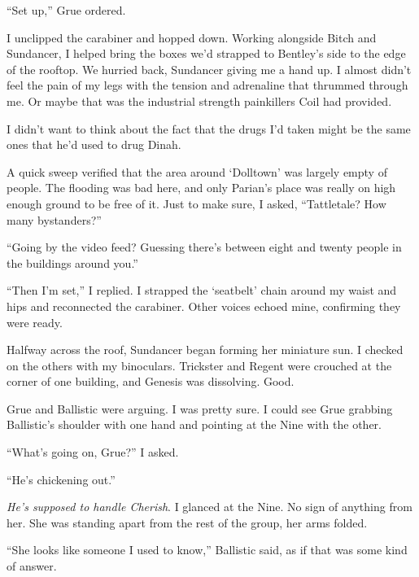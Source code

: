 ``Set up,'' Grue ordered.



I unclipped the carabiner and hopped down.  Working alongside Bitch and Sundancer, I helped bring the boxes we'd strapped to Bentley's side to the edge of the rooftop.  We hurried back, Sundancer giving me a hand up.  I almost didn't feel the pain of my legs with the tension and adrenaline that thrummed through me.  Or maybe that was the industrial strength painkillers Coil had provided.



I didn't want to think about the fact that the drugs I'd taken might be the same ones that he'd used to drug Dinah.



A quick sweep verified that the area around `Dolltown' was largely empty of people.  The flooding was bad here, and only Parian's place was really on high enough ground to be free of it.  Just to make sure, I asked, ``Tattletale?  How many bystanders?''



``Going by the video feed?  Guessing there's between eight and twenty people in the buildings around you.''



``Then I'm set,'' I replied.  I strapped the `seatbelt' chain around my waist and hips and reconnected the carabiner.  Other voices echoed mine, confirming they were ready.



Halfway across the roof, Sundancer began forming her miniature sun.  I checked on the others with my binoculars.  Trickster and Regent were crouched at the corner of one building, and Genesis was dissolving.  Good.



Grue and Ballistic were arguing.  I was pretty sure.  I could see Grue grabbing Ballistic's shoulder with one hand and pointing at the Nine with the other.



``What's going on, Grue?'' I asked.



``He's chickening out.''



\emph{He's supposed to handle Cherish}.  I glanced at the Nine.  No sign of anything from her.  She was standing apart from the rest of the group, her arms folded.



``She looks like someone I used to know,'' Ballistic said, as if that was some kind of answer.



